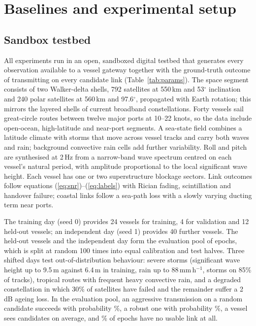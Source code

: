 \section{Baselines and experimental setup}\label{sec:setup}
\subsection{Sandbox testbed}
All experiments run in an open, sandboxed digital testbed that generates every observation available to a vessel gateway together with the ground-truth outcome of transmitting on every candidate link (Table~\ref{tab:params}). The space segment consists of two Walker-delta shells, 792 satellites at 550\,km and 53$^\circ$ inclination and 240 polar satellites at 560\,km and 97.6$^\circ$, propagated with Earth rotation; this mirrors the layered shells of current broadband constellations\cite{kodheli2021,michel2022}. Forty vessels sail great-circle routes between twelve major ports at 10--22 knots, so the data include open-ocean, high-latitude and near-port segments. A sea-state field combines a latitude climate with storms that move across vessel tracks and carry both waves and rain; background convective rain cells add further variability. Roll and pitch are synthesised at 2\,Hz from a narrow-band wave spectrum centred on each vessel's natural period, with amplitude proportional to the local significant wave height. Each vessel has one or two superstructure blockage sectors. Link outcomes follow equations (\ref{eq:snr})--(\ref{eq:labels}) with Rician fading, scintillation and handover failure; coastal links follow a sea-path loss with a slowly varying ducting term near ports.

The training day (seed 0) provides 24 vessels for training, 4 for validation and 12 held-out vessels; an independent day (seed 1) provides 40 further vessels. The held-out vessels and the independent day form the evaluation pool of \RNPool{} epochs, which is split at random 100 times into equal calibration and test halves. Three shifted days test out-of-distribution behaviour: severe storms (significant wave height up to 9.5\,m against 6.4\,m in training, rain up to 88\,mm\,h$^{-1}$, storms on 85\% of tracks), tropical routes with frequent heavy convective rain, and a degraded constellation in which 30\% of satellites have failed and the remainder suffer a 2\,dB ageing loss. In the evaluation pool, an aggressive transmission on a random candidate succeeds with probability \RPAggr\%, a robust one with probability \RPRob\%, a vessel sees \RNCand{} candidates on average, and \RNoLink\% of epochs have no usable link at all.

